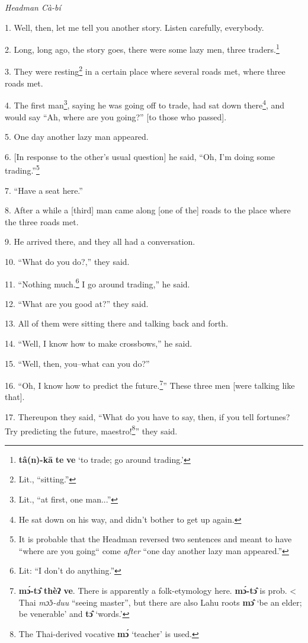 \setcounter{footnote}{0}

\textit{Headman Cà-bí}

1. Well, then, let me tell you another story. Listen carefully, everybody.

2. Long, long ago, the story goes, there were some lazy men, three traders.\footnote{\textbf{tâ(n)-kā} \textbf{te} \textbf{ve} `to trade; go around trading.'}

3. They were resting\footnote{Lit., ``sitting.''} in a certain place where several roads met, where three
roads met.

4. The first man\footnote{Lit., ``at first, one man...''}, saying he was going off to trade, had sat down there\footnote{He sat down on his way, and didn't bother to get up again.},
and would say ``Ah, where are you going?'' [to those who passed].

5. One day another lazy man appeared.

6. [In response to the other's usual question] he said, ``Oh, I'm doing
some trading.''\footnote{It is probable that the Headman reversed two sentences and meant to have ``where are you going`` come \textit{after} ``one day another lazy man appeared.''}

7. ``Have a seat here.''

8. After a while a [third] man came along [one of the] roads to the place where
the three roads met.

9. He arrived there, and they all had a conversation.

10. ``What do you do?,'' they said.

11. ``Nothing much.\footnote{Lit: ``I don't do anything.''} I go around trading,'' he said.

12. ``What are you good at?'' they said.

13. All of them were sitting there and talking back and forth.

14. ``Well, I know how to make crossbows,'' he said.

15. ``Well, then, you--what can you do?''

16. ``Oh, I know how to predict the future.\footnote{\textbf{mɔ́-tɔ̂} \textbf{thèʔ} \textbf{ve}. There is apparently a folk-etymology here. \textbf{mɔ́-tɔ̂} is prob. < Thai \textit{mɔ̌ɔ-duu} ``seeing master'', but there are also Lahu roots \textbf{mɔ̂} `be an elder; be venerable' and \textbf{tɔ̂} `words.'}'' These three men
[were talking like that].

17. Thereupon they said, ``What do you have to say, then, if you tell fortunes?
Try predicting the future, maestro!\footnote{The Thai-derived vocative \textbf{mɔ́} `teacher' is used.}'' they said.

